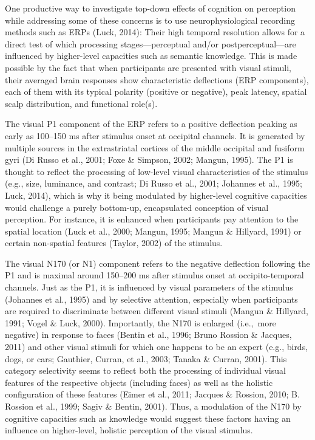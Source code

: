 \documentclass[
  english,
  man,12pt,twoside]{apa7}
\begin{document}
One productive way to investigate top-down effects of cognition on perception while addressing some of these concerns is to use neurophysiological recording methods such as ERPs (Luck, 2014): Their high temporal resolution allows for a direct test of which processing stages---perceptual and/or postperceptual---are influenced by higher-level capacities such as semantic knowledge. This is made possible by the fact that when participants are presented with visual stimuli, their averaged brain responses show characteristic deflections (ERP components), each of them with its typical polarity (positive or negative), peak latency, spatial scalp distribution, and functional role(s).

The visual P1 component of the ERP refers to a positive deflection peaking as early as 100--150 ms after stimulus onset at occipital channels. It is generated by multiple sources in the extrastriatal cortices of the middle occipital and fusiform gyri (Di Russo et al., 2001; Foxe \& Simpson, 2002; Mangun, 1995). The P1 is thought to reflect the processing of low-level visual characteristics of the stimulus (e.g., size, luminance, and contrast; Di Russo et al., 2001; Johannes et al., 1995; Luck, 2014), which is why it being modulated by higher-level cognitive capacities would challenge a purely bottom-up, encapsulated conception of visual perception. For instance, it is enhanced when participants pay attention to the spatial location (Luck et al., 2000; Mangun, 1995; Mangun \& Hillyard, 1991) or certain non-spatial features (Taylor, 2002) of the stimulus.

The visual N170 (or N1) component refers to the negative deflection following the P1 and is maximal around 150--200 ms after stimulus onset at occipito-temporal channels. Just as the P1, it is influenced by visual parameters of the stimulus (Johannes et al., 1995) and by selective attention, especially when participants are required to discriminate between different visual stimuli (Mangun \& Hillyard, 1991; Vogel \& Luck, 2000). Importantly, the N170 is enlarged (i.e.,~more negative) in response to faces (Bentin et al., 1996; Bruno Rossion \& Jacques, 2011) and other visual stimuli for which one happens to be an expert (e.g., birds, dogs, or cars; Gauthier, Curran, et al., 2003; Tanaka \& Curran, 2001). This category selectivity seems to reflect both the processing of individual visual features of the respective objects (including faces) as well as the holistic configuration of these features (Eimer et al., 2011; Jacques \& Rossion, 2010; B. Rossion et al., 1999; Sagiv \& Bentin, 2001). Thus, a modulation of the N170 by cognitive capacities such as knowledge would suggest these factors having an influence on higher-level, holistic perception of the visual stimulus.
\end{document}
